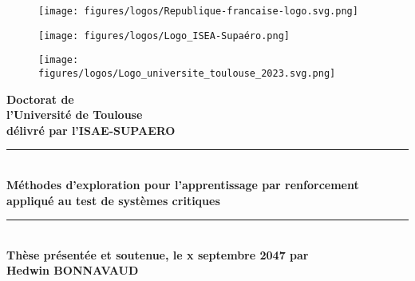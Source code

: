 \documentclass[a4paper,12pt]{article}
\begin{document}
\begin{figure}[!htb]
    \begin{minipage}{0.2\textwidth}
      \centering
      \texttt{[image: figures/logos/Republique-francaise-logo.svg.png]}
    \end{minipage}\hfill
    \begin{minipage}{0.15\textwidth}
      \centering
      \texttt{[image: figures/logos/Logo\_ISEA-Supaéro.png]}
    \end{minipage}
    \begin{minipage}{0.22\textwidth}
      \centering
      \texttt{[image: figures/logos/Logo\_universite\_toulouse\_2023.svg.png]}
    \end{minipage}
 \end{figure}


\begin{flushright}
    \textbf{\huge Doctorat de\\ l'Université de Toulouse} \\[0.5cm]
    \textbf{\large délivré par l'ISAE-SUPAERO} \\[2cm]
    
    \noindent\rule{8cm}{0.4pt}  %
    \\[0.5cm]
    \textbf{\large Méthodes d'exploration pour l'apprentissage par renforcement appliqué au test de systèmes critiques} \\[1.5cm]
    \noindent\rule{8cm}{0.4pt}  %
    \\[1.5cm]
    
    \textbf{\Large Thèse présentée et soutenue, le x septembre 2047 par} \\[0.5cm]
    
    {\huge \textbf{Hedwin BONNAVAUD}} \\[2cm]
\end{flushright}
\end{document}
